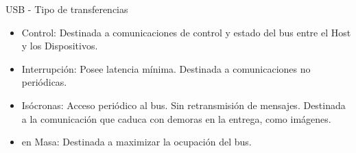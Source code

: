 \begin{frame}{USB - Tipo de transferencias}
	\centering
	\begin{itemize}
		\item Control: Destinada a comunicaciones de control y estado del bus entre el Host y los Dispositivos.
		\item Interrupción: Posee latencia mínima. Destinada a comunicaciones no periódicas.
		\item Isócronas: Acceso periódico al bus. Sin retransmisión de mensajes. Destinada a la comunicación que caduca con demoras en la entrega, como imágenes.
		\item en Masa: Destinada a maximizar la ocupación del bus.
	\end{itemize}
%
\end{frame}
